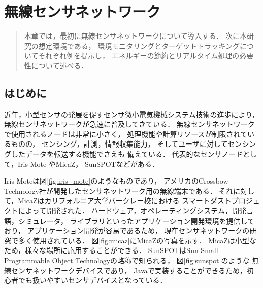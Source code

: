 \chapter{無線センサネットワーク}
\begin{large}
\begin{quote}
本章では，最初に無線センサネットワークについて導入する．
次に本研究の想定環境である，
環境モニタリングとターゲットトラッキングについてそれぞれ例を提示し，
エネルギーの節約とリアルタイム処理の必要性について述べる．
\end{quote}
\end{large}
\clearpage

\section{はじめに}
近年，小型センサの発展を促すセンサ微小電気機械システム技術の進歩により，
無線センサネットワークが急速に普及してきている．
無線センサネットワークで使用されるノードは非常に小さく，
処理機能や計算リソースが制限されているものの，
センシング，計測，情報収集能力，
そしてユーザに対してセンシングしたデータを転送する機能でさえも
備えている．
代表的なセンサノードとして，Iris Mote\cite{irismote}
やMicaZ\cite{Hill:2002:MWP:623308.624560}，
SunSPOT\cite{sunspot}などがある．

Iris Moteは図\ref{fig:iris_mote}のようなものであり，
アメリカのCrossbow Technology社が開発したセンサネットワーク用の無線端末である．
それに対して，MicaZはカリフォルニア大学バークレー校における
スマートダストプロジェクト\cite{Kahn:1999:NCC:313451.313558}によって開発された．
ハードウェア，オペレーティングシステム，開発言語，シミュレータ，
ライブラリといったアプリケーション開発環境を提供しており，
アプリケーション開発が容易であるため，
現在センサネットワークの研究で多く使用されている．
図\ref{fig:micaz}にMicaZの写真を示す．
MicaZは小型なため，様々な場所に応用することができる．
SunSPOTはSun Small Programmable Object Technologyの略称で知られる，
図\ref{fig:sunspot}のような
無線センサネットワークデバイスであり，
Javaで実装することができるため，初心者でも扱いやすいセンサデバイスとなっている．


